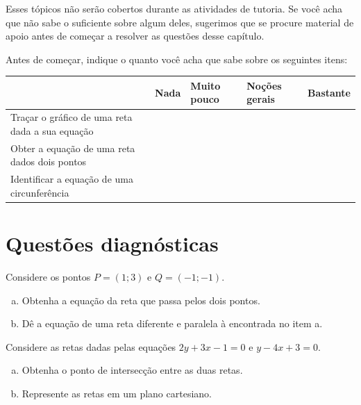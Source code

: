 \documentclass[main.tex]{subfiles}
\begin{document}
Esses tópicos não serão cobertos durante as atividades de tutoria. Se você acha que não sabe o suficiente sobre algum deles, sugerimos que se procure material de apoio antes de começar a resolver as questões desse capítulo.

\paraFolhaAvaliacoes

Antes de começar, indique o quanto você acha que sabe sobre os seguintes itens:

\begin{center}
 \begin{tabular}{|p{35mm}||p{15mm}|p{15mm}|p{15mm}|p{15mm}|} 
 \hline
   & Nada & Muito pouco & Noções gerais & Bastante\\
 \hline
 Traçar o gráfico de uma reta dada a sua equação &  &  &  &  \\ 
 \hline
 Obter a equação de uma reta dados dois pontos &  &  &  &  \\
 \hline
 Identificar a equação de uma circunferência &  &  &  &  \\
 \hline
\end{tabular}
\end{center}

\paraAmbos

\section{Questões diagnósticas}

\begin{diagnostico}
Considere os pontos $P=(1;3)$ e $Q=(-1;-1)$.
\begin{enumerate}[a)]
\item Obtenha a equação da reta que passa pelos dois pontos.
\item Dê a equação de uma reta diferente e paralela à encontrada no item a.
\end{enumerate}
\end{diagnostico}

\begin{diagnostico}
Considere as retas dadas pelas equações $2y+3x-1=0$ e $y-4x+3=0$.
\begin{enumerate}[a)]
\item Obtenha o ponto de intersecção entre as duas retas.
\item Represente as retas em um plano cartesiano.
\end{enumerate}
\end{diagnostico}
\end{document}
